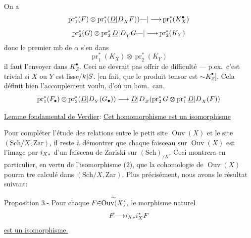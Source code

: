 On a
\[
\operatorname{pr}_1^*(F)\otimes\operatorname{pr}_1^*({\underline{D}|D}_X F)){\text{---}|\longrightarrow}\operatorname{pr}_1^*(K_X^\bullet)
\]
\[
\operatorname{pr}_2^*(G)\otimes\operatorname{pr}_{{2}}^*{\underline{D}|D}_Y G{\text{---}|\longrightarrow}\operatorname{pr}_2^*(K_Y)
\]
donc le premier mb de \textcircled{\scriptsize$\alpha$} s'en  dans
\[
\operatorname{pr}_1^*(K_X)\otimes\operatorname{pr}_2^*(K_Y)
\]
il faut l'envoyer  dans $K_Z^\bullet$. Ceci ne devrait pas offrir de difficulté --- p.ex.\ c'est trivial si $X$ ou $Y$ est lisse/${k|S}$.
[en fait,  que le produit tensor est $\sim K_Z^\bullet$].
Cela définit bien l'accouplement voulu, d'où un \uline{hom.\ can.}
\margin{\textcircled{**}}
\[
\operatorname{pr}_1^*(F_\bullet)\otimes\operatorname{pr}_2^*({\underline{D}|D}_Y(G_\bullet))\longrightarrow{\underline{D}|D}_Z(\operatorname{pr}_2^*G\otimes\operatorname{pr}_1^*{\underline{D}|D}_X(F))
\]

\uline{Lemme fondamental de Verdier}: \uline{Cet homomorphisme est un isomorphisme}


Pour compléter l'étude des relations entre le petit site $\operatorname{Ouv}(X)$ et le site $(\mathrm{Sch}/X,\mathrm{Zar})$, il reste à démontrer que chaque faisceau sur $\operatorname{Ouv}(X)$ est l'image par $i_{X{*}}$ d'un faisceau de Zariski sur $(\mathrm{Sch})_{/X}$. Ceci montrera en particulier, en vertu de l'isomorphisme (2), que la cohomologie de $\operatorname{Ouv}(X)$ pourra tre calculé dans $(\mathrm{Sch}/X,\mathrm{Zar})$. Plus précisément, nous avons le résultat suivant:

\uline{Proposition} 3.- \uline{Pour chaque} $F{\in}\overset{{\sim}}{\operatorname{Ouv}(X)}$, \uline{le morphisme naturel}
\[
F{\longrightarrow}i_{X{*}}i_X^{{*}}F
\]
\uline{est un isomorphisme.}

